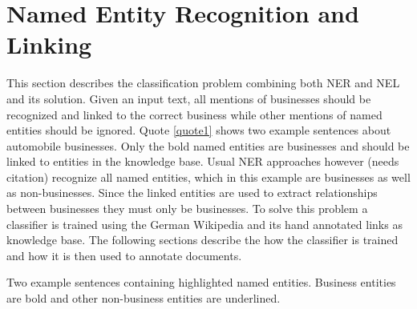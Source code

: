\section{Named Entity Recognition and Linking}
\label{sec:NEL}
This section describes the classification problem combining both NER and NEL and its solution. Given an input text, all mentions of businesses should be recognized and linked to the correct business while other mentions of named entities should be ignored. Quote \ref{quote1} shows two example sentences about automobile businesses. Only the bold named entities are businesses and should be linked to entities in the knowledge base. Usual NER approaches however (needs citation) recognize all named entities, which in this example are businesses as well as non-businesses. Since the linked entities are used to extract relationships between businesses they must only be businesses. To solve this problem a classifier is trained using the German Wikipedia and its hand annotated links as knowledge base. The following sections describe the how the classifier is trained and how it is then used to annotate documents.\\
\begin{nscenter}
	\begin{quotecaption}
	Two example sentences containing highlighted named entities. Business entities are bold and other non-business entities are underlined.
	\label{quote1}
	\end{quotecaption}
\end{nscenter}

